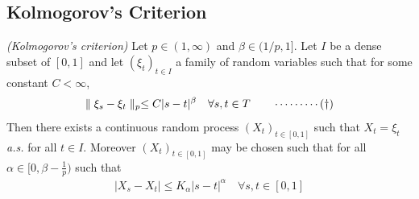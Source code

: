 \documentclass[10pt,a4paper]{report}
\begin{document}
\subsection*{Kolmogorov's Criterion}

 \emph{(Kolmogorov's criterion)} Let $p \in (1,\infty)$ and $\beta \in (1/p,1]$. Let $I$ be a dense subset of $[0,1]$ and let $(\xi_t )_{t\in I}$ a family of random variables such that for some constant $C<\infty$,
\begin{align*}
\parallel \xi_s - \xi_t \parallel_{p} \leq C|s-t|^{\beta} \quad \forall s,t\in T \quad \quad \cdots\cdots\cdots (\dagger)
\end{align*}
Then there exists a continuous random process $(X_t)_{t\in [0,1]}$ such that $X_t = \xi_t$ \emph{a.s.} for all $t\in I$. Moreover $(X_t)_{t\in [0,1]}$ may be chosen such that for all $\alpha \in [0, \beta - \frac{1}{p})$ such that
\begin{align*}
|X_s - X_t| \leq K_{\alpha} |s-t|^{\alpha} \quad \forall s,t \in [0,1]
\end{align*}
\s
\end{document}

